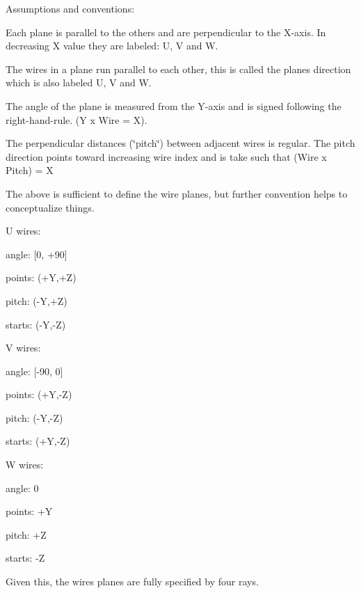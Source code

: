 Assumptions and conventions\+:


\begin{DoxyItemize}
\item Each plane is parallel to the others and are perpendicular to the X-\/axis. In decreasing X value they are labeled\+: U, V and W.
\item The wires in a plane run parallel to each other, this is called the plane\textquotesingle{}s direction which is also labeled U, V and W.
\item The angle of the plane is measured from the Y-\/axis and is signed following the right-\/hand-\/rule. (Y x Wire = X).
\item The perpendicular distances (\char`\"{}pitch\char`\"{}) between adjacent wires is regular. The pitch direction points toward increasing wire index and is take such that (Wire x Pitch) = X
\end{DoxyItemize}

The above is sufficient to define the wire planes, but further convention helps to conceptualize things.

U wires\+:
\begin{DoxyItemize}
\item angle\+: \mbox{[}0, +90\mbox{]}
\item points\+: (+Y,+Z)
\item pitch\+: (-\/Y,+Z)
\item starts\+: (-\/Y,-\/Z)
\end{DoxyItemize}

V wires\+:
\begin{DoxyItemize}
\item angle\+: \mbox{[}-\/90, 0\mbox{]}
\item points\+: (+Y,-\/Z)
\item pitch\+: (-\/Y,-\/Z)
\item starts\+: (+Y,-\/Z)
\end{DoxyItemize}

W wires\+:
\begin{DoxyItemize}
\item angle\+: 0
\item points\+: +Y
\item pitch\+: +Z
\item starts\+: -\/Z
\end{DoxyItemize}

Given this, the wires planes are fully specified by four rays.


